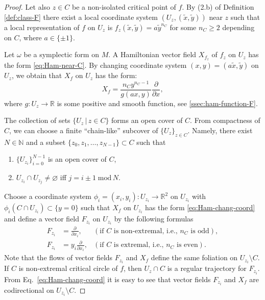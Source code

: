 \documentclass[10pt,a4paper]{amsart}
\newcommand{\bbN}{\mathbb{N}}
\newcommand{\bbR}{\mathbb{R}}
\begin{document}
\begin{proof}
Let also $z\in C$ be a non-isolated critical point of $f$. By (2.b) of Definition \ref{def:class-F} there exist a local coordinate system $(U_z, (\tilde{x},\tilde{y}))$ near $z$ such that a local representation of $f$ on $U_z$ is $f_z(\tilde{x},\tilde{y}) = a \tilde{y}^{n_C}$ for  some $n_C\geq 2$ depending on $C$, where $a \in \{ \pm 1\}$.

Let $\omega$ be a symplectic form on $M$.
 A Hamiltonian vector field $X_{f_z}$ of $f_z$ on $U_z$ has the form \eqref{eq:Ham-near-C}. By changing coordinate system $(x,y)= (a\tilde{x},\tilde{y})$ on $U_z$, we obtain that $X_f$ on $U_z$ has the form:
\begin{equation}\label{eq:Ham-chang-coord}
	X_f = \frac{n_Cy^{n_C-1}}{{g}(a x,y)}\frac{\partial}{\partial x},
\end{equation}
where $g:U_z\to \bbR$ is some positive and smooth function, see \textsection\ref{ssec:ham-function-F}.

The collection of sets $\{U_z\,|\,z\in C \}$ forms an open cover of $C$. From compactness of $C$, we can choose a finite ``chain-like'' subcover of $\{U_z\}_{z\in C}$. Namely,  
there exist $N\in \bbN$ and a subset $\{z_0, z_1,\ldots, z_{N-1}\}\subset C$ such that
\begin{enumerate}
	\item $\{U_{z_i}\}_{i = 0}^{N-1}$ is an open cover of $C$,
	\item $U_{z_i}\cap U_{z_j}\neq \varnothing$ iff $j = i\pm 1\;\mathrm{mod}\, N$.  
\end{enumerate}
{Choose a coordinate system $\phi_i = (x_i, y_i):U_{z_i}\to\mathbb{R}^2$ on $U_{z_i}$ with $\phi_i(C\cap U_{z_i})\subset \{y = 0\}$} such that  $X_f$ on $U_{z_i}$ has the form \eqref{eq:Ham-chang-coord} and
define a vector field $F_{z_i}$ on $U_{z_i}$ by the following formulas
\begin{align}
	F_{z_i} &= \frac{\partial}{\partial x_i}, &(\text{if $C$ is non-extremal, i.e., $n_C$ is odd}), \label{eq:F_z-C-non-extr}\\
	F_{z_i} &= y_i\frac{\partial}{\partial x_i}, &(\text{if $C$ is extremal, i.e., $n_C$ is even}). \label{eq:F_z-C-extr}
\end{align}
Note that the flows of vector fields $F_{z_i}$ and $X_f$ define the same foliation on $U_{z_i}\setminus C$.
If $C$ is non-extremal critical circle of $f$, then $U_z\cap C$ is a regular trajectory for $F_{z_i}$. 
From Eq.~\eqref{eq:Ham-chang-coord} it is easy to see that vector fields $F_{z_i}$  and $X_f$ are codirectional on $U_{z_i}\setminus C$.



\end{proof}
\end{document}
